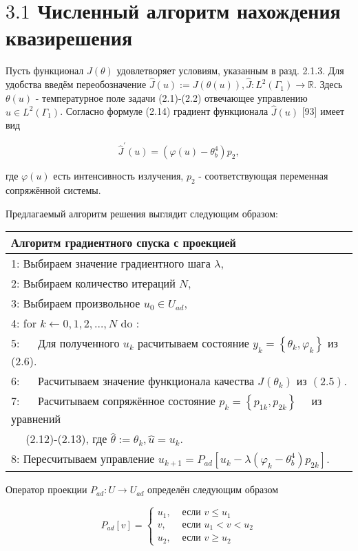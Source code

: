 \documentclass[10pt]{article}
\begin{document}
\section{$3.1$ Численный алгоритм нахождения квазирешения}
Пусть функционал $J(\theta)$ удовлетворяет условиям, указанным в разд. 2.1.3. Для удобства введём переобозначение $\hat{J}(u):=J(\theta(u)), \hat{J}: L^{2}\left(\Gamma_{1}\right) \rightarrow \mathbb{R}$. Здесь $\theta(u)$ - температурное поле задачи (2.1)-(2.2) отвечающее управлению $u \in L^{2}\left(\Gamma_{1}\right)$. Согласно формуле (2.14) градиент функционала $\hat{J}(u)$ [93] имеет вид

$$
\hat{J}^{\prime}(u)=\left(\varphi(u)-\theta_{b}^{4}\right) p_{2},
$$

где $\varphi(u)$ есть интенсивность излучения, $p_{2}$ - соответствующая переменная сопряжённой системы.

Предлагаемый алгоритм решения выглядит следующим образом:

\begin{center}
\begin{tabular}{l}
\hline
Алгоритм градиентного спуска с проекцией \\
\hline
1: Выбираем значение градиентного шага $\lambda$, \\
2: Выбираем количество итераций $N$, \\
3: Выбираем произвольное $u_{0} \in U_{a d}$, \\
4: for $k \leftarrow 0,1,2, \ldots, N$ do : \\
5: $\quad$ Для полученного $u_{k}$ расчитываем состояние $y_{k}=\left\{\theta_{k}, \varphi_{k}\right\}$ из (2.6). \\
6: $\quad$ Расчитываем значение функционала качества $J\left(\theta_{k}\right)$ из $(2.5)$. \\
7: $\quad$ Расчитываем сопряжённое состояние $p_{k}=\left\{p_{1 k}, p_{2 k}\right\} \quad$ из уравнений \\
$\quad$ (2.12)-(2.13), где $\hat{\theta}:=\theta_{k}, \hat{u}=u_{k}$. \\
8: Пересчитываем управление $u_{k+1}=P_{a d}\left[u_{k}-\lambda\left(\varphi_{k}-\theta_{b}^{4}\right) p_{2 k}\right]$. \\
\hline
\end{tabular}
\end{center}

Оператор проекции $P_{a d}: U \rightarrow U_{a d}$ определён следующим образом

$$
P_{a d}[v]= \begin{cases}u_{1}, & \text { если } v \leqslant u_{1} \\ v, & \text { если } u_{1}<v<u_{2} \\ u_{2}, & \text { если } v \geqslant u_{2}\end{cases}
$$
\end{document}
